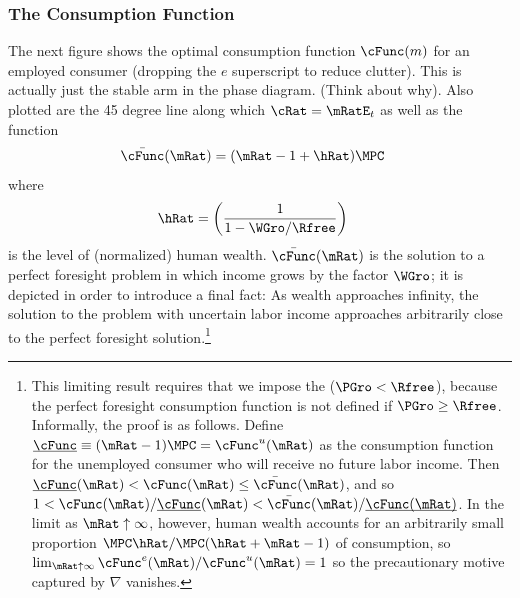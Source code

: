 \documentclass{handout}
\begin{document}
\subsubsection{The Consumption Function}
The next figure shows the optimal consumption function $\cFunc(m)$ for an
employed consumer (dropping the $e$ superscript to reduce clutter).  This
is actually just the stable arm in the phase diagram.  (Think about
why).  Also plotted are the 45 degree line along which $\cRat = \mRatE_{t}$
as well as the function
\begin{equation}\begin{gathered}\begin{aligned}
  \bar{\cFunc}(\mRat) & =  (\mRat-1+\hRat)\MPCU
\end{aligned}\end{gathered}\end{equation}
where
\begin{equation}\begin{gathered}\begin{aligned}
  \hRat & =  \left(\frac{1}{1-\WGro/\Rfree}\right)
\end{aligned}\end{gathered}\end{equation}
is the level of (normalized) human wealth.  $\bar{\cFunc}(\mRat)$ is the
solution to a perfect foresight problem in which income 
grows by the factor $\WGro$; it is depicted in order to
introduce a final fact: As wealth approaches infinity, the solution
to the problem with uncertain labor income approaches arbitrarily
close to the perfect foresight solution.\footnote{This
  limiting result requires that we impose the \FHWCPGro ($\PGro < \Rfree$), because the perfect foresight consumption function is
  not defined if $\PGro \geq \Rfree$.  Informally, the proof is as follows.  Define $\underbar{\cFunc}\equiv (\mRat-1)\MPCU=\cFunc^{u}(\mRat)$ as the consumption function for the unemployed consumer who will receive no future labor income.  Then$\underbar{\cFunc}(\mRat) < \cFunc(\mRat) \leq \bar{\cFunc}(\mRat)$, and so $1 < \cFunc(\mRat)/\underbar{\cFunc}(\mRat)<\bar{\cFunc}(\mRat)/\underbar{\cFunc(\mRat)}$. In the limit as $\mRat \uparrow \infty$, however, human wealth accounts for an arbitrarily small proportion $\MPCU \hRat/\MPCU (\hRat+\mRat-1)$ of consumption, so $\lim_{\mRat \uparrow \infty} \cFunc^{e}(\mRat)/\cFunc^{u}(\mRat) = 1$ so the precautionary motive captured by $\nabla$ vanishes.}
\end{document}
